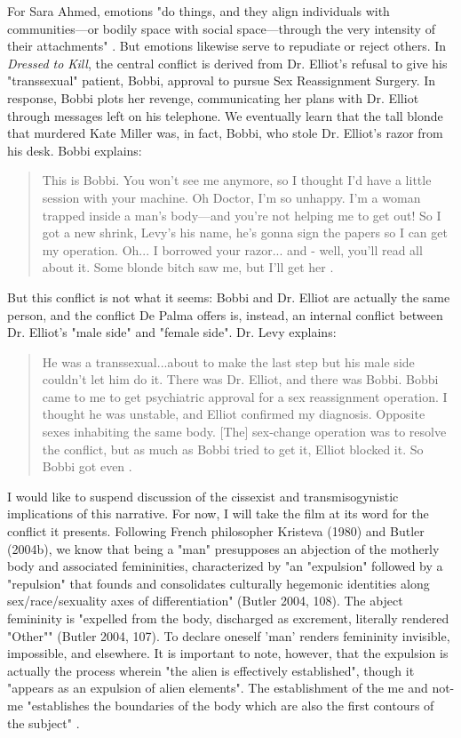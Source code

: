 \documentclass[letterpaper,12pt]{turabian-researchpaper}
\begin{document}
For Sara Ahmed, emotions "do things, and they align individuals with communities---or bodily space with social space---through the very intensity of their attachments" \autocite[119]{ahmed_affective_2004}. But emotions likewise serve to repudiate or reject others. In \textit{Dressed to Kill}, the central conflict is derived from Dr. Elliot's refusal to give his "transsexual" patient, Bobbi, approval to pursue Sex Reassignment Surgery. In response, Bobbi plots her revenge, communicating her plans with Dr. Elliot through messages left on his telephone. We eventually learn that the tall blonde that murdered Kate Miller was, in fact, Bobbi, who stole Dr. Elliot's razor from his desk. Bobbi explains:
\begin{quotation} 
\noindent This is Bobbi. You won't see me anymore, so I thought I'd have a little session with your machine. Oh Doctor, I'm so unhappy. I'm a woman trapped inside a man's body---and you're not helping me to get out! So I got a new shrink, Levy's his name, he's gonna sign the papers so I can get my operation. Oh... I borrowed your razor... and - well, you'll read all about it. Some blonde bitch saw me, but I'll get her \autocite{de_palma_dressed_2015}.
\end{quotation}
\noindent But this conflict is not what it seems: Bobbi and Dr. Elliot are actually the same person, and the conflict De Palma offers is, instead, an internal conflict between Dr. Elliot's "male side" and "female side". Dr. Levy explains:
\begin{quotation}
\noindent He was a transsexual...about to make the last step but his male side couldn't let him do it. There was Dr. Elliot, and there was Bobbi. Bobbi came to me to get psychiatric approval for a sex reassignment operation. I thought he was unstable, and Elliot confirmed my diagnosis. Opposite sexes inhabiting the same body. [The] sex-change operation was to resolve the conflict, but as much as Bobbi tried to get it, Elliot blocked it. So Bobbi got even \autocite{de_palma_dressed_2015}.
\end{quotation}
\noindent I would like to suspend discussion of the cissexist and transmisogynistic implications of this narrative. For now, I will take the film at its word for the conflict it presents. Following French philosopher Kristeva (1980) and Butler (2004b), we know that being a "man" presupposes an abjection of the motherly body and associated femininities, characterized by "an "expulsion" followed by a "repulsion" that founds and consolidates culturally hegemonic identities along sex/race/sexuality axes of differentiation" (Butler 2004, 108). The abject femininity is "expelled from the body, discharged as excrement, literally rendered "Other"" (Butler 2004, 107). To declare oneself 'man' renders femininity invisible, impossible, and elsewhere. It is important to note, however, that the expulsion is actually the process wherein "the alien is effectively established", though it "appears as an expulsion of alien elements"\autocite[107]{butler_melancholy_2004}. The establishment of the me and not-me "establishes the boundaries of the body which are also the first contours of the subject" \autocite[107]{butler_melancholy_2004}.
\end{document}
